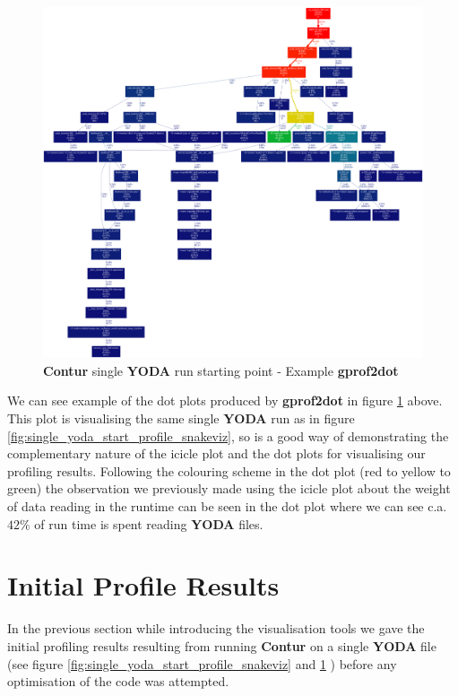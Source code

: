 \begin{figure}[H]
\centering
\includegraphics[scale=0.2]{plots/initial_contur_single_yoda.png}
\caption{\textbf{Contur} single \textbf{YODA} run starting point - Example \textbf{gprof2dot}}
\label{fig:single_yoda_start_profile_gprof2dot}
\end{figure}

We can see example of the dot plots produced by \textbf{gprof2dot} in figure \ref{fig:single_yoda_start_profile_gprof2dot} above. This plot is visualising the same single \textbf{YODA}  run as in figure \ref{fig:single_yoda_start_profile_snakeviz}, so is a good way of demonstrating the complementary nature of the icicle plot and the dot plots for visualising our profiling results. Following the colouring scheme in the dot plot (red to yellow to green) the observation we previously made using the icicle plot about the weight of data reading in the runtime can be seen in the dot plot where we can see c.a. $42\%$ of run time is spent reading \textbf{YODA} files.

\section{Initial Profile Results}
In the previous section while introducing the visualisation tools we gave the initial profiling results resulting from running \textbf{Contur} on a single \textbf{YODA} file (see figure \ref{fig:single_yoda_start_profile_snakeviz} and \ref{fig:single_yoda_start_profile_gprof2dot} ) before any optimisation of the code was attempted. 


